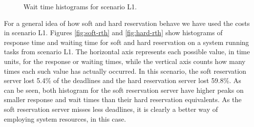 \documentclass[times, 10pt,twocolumn]{article}
\begin{document}
\begin{figure}[t]
  \centering
  \caption{Wait time histograms for scenario L1.}
  \label{fig:dth}
\end{figure}

For a general idea of how soft and hard reservation behave we have
used the costs in scenario L1. Figures \ref{fig:soft-rth} and
\ref{fig:hard-rth} show histograms of response time and waiting time
for soft and hard reservation on a system running tasks from scenario
L1. The horizontal axis represents each possible value, in time units,
for the response or waiting times, while the vertical axis counts how
many times each such value has actually occurred. In this scenario,
the soft reservation server lost 5.4\% of the deadlines and the hard
reservation server lost 59.8\%. As can be seen, both histogram for the
soft reservation server have higher peaks on smaller response and wait
times than their hard reservation equivalents. As the soft reservation
server misses less deadlines, it is clearly a better way of employing
system resources, in this case.
\end{document}
